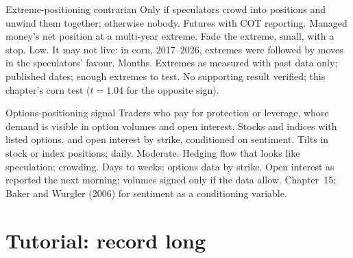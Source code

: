 \begin{strategyfile}{Extreme-positioning contrarian}\label{strat:s1:positioning-and-sentiment:extreme}
 Only if speculators crowd into positions and unwind them together; otherwise nobody.
 Futures with COT reporting.
 Managed money's net position at a multi-year extreme.
 Fade the extreme, small, with a stop.
 Low.
 It may not live: in corn, 2017--2026, extremes were followed by moves in the speculators' favour.
 Months.
 Extremes as measured with past data only; published dates; enough extremes to test.
 No supporting result verified; this chapter's corn test ($t = 1.04$ for the opposite sign).
\end{strategyfile}

\begin{strategyfile}{Options-positioning signal}\label{strat:s1:positioning-and-sentiment:options}
 Traders who pay for protection or leverage, whose demand is visible in option volumes and open interest.
 Stocks and indices with listed options.
  and open interest by strike, conditioned on sentiment.
 Tilts in stock or index positions; daily.
 Moderate.
 Hedging flow that looks like speculation; crowding.
 Days to weeks; options data by strike.
 Open interest as reported the next morning; volumes signed only if the data allow.
 Chapter~15; Baker and Wurgler (2006) for sentiment as a conditioning variable.
\end{strategyfile}

\section{Tutorial: record long}\label{tut:s1:positioning-and-sentiment:tut}

